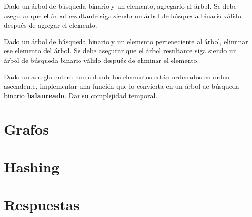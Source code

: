 \documentclass[titlepage,oneside]{book}
\begin{document}
\begin{Exercise}
   Dado un árbol de búsqueda binario y un elemento, agregarlo al árbol. Se debe asegurar que el árbol resultante siga siendo un árbol de búsqueda binario válido después de agregar el elemento.
\end{Exercise}

\begin{Exercise}
   Dado un árbol de búsqueda binario y un elemento perteneciente al árbol, eliminar ese elemento del árbol. Se debe asegurar que el árbol resultante siga siendo un árbol de búsqueda binario válido después de eliminar el elemento.
\end{Exercise}

\begin{Exercise}
   Dado un arreglo entero nums donde los elementos están ordenados en orden ascendente, implementar una función que lo convierta en un árbol de búsqueda binario \textbf{balanceado}. Dar su complejidad temporal.
\end{Exercise}



\chapter{Grafos}

\chapter{Hashing}

\chapter{Respuestas}
\shipoutAnswer
\end{document}

